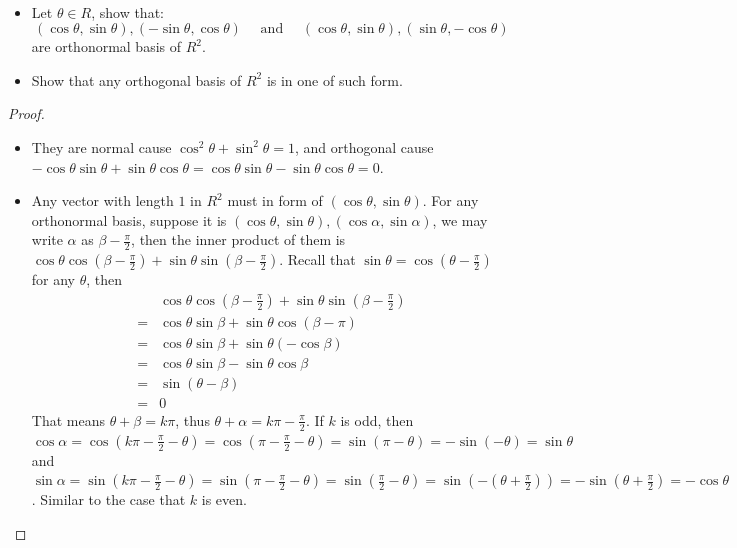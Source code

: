 \documentclass[../main.tex]{subfiles}
\begin{document}
\begin{exercise}
  ~
  \begin{itemize}
    \item Let $\theta \in R$, show that:
          \[
          (\cos \theta, \sin \theta), (- \sin \theta, \cos \theta)
          \quad \text{ and } \quad
          (\cos \theta, \sin \theta), (\sin \theta, - \cos \theta)
          \]
          are orthonormal basis of $R^2$.
    \item Show that any orthogonal basis of $R^2$ is in one of such form.
  \end{itemize}
\end{exercise}
\begin{proof}
  ~
  \begin{itemize}
    \item They are normal cause $\cos^2 \theta + \sin^2 \theta = 1$,
          and orthogonal cause $- \cos \theta \sin \theta + \sin \theta \cos \theta = \cos \theta \sin \theta - \sin \theta \cos \theta = 0$.
    \item Any vector with length $1$ in $R^2$ must in form of $(\cos \theta, \sin \theta)$.
          For any orthonormal basis, suppose it is $(\cos \theta, \sin \theta), (\cos \alpha, \sin \alpha)$,
          we may write $\alpha$ as $\beta - \frac{\pi}{2}$, then the inner product of them
          is $\cos \theta \cos (\beta - \frac{\pi}{2}) + \sin \theta \sin (\beta - \frac{\pi}{2})$.
          Recall that $\sin \theta = \cos (\theta - \frac{\pi}{2})$ for any $\theta$, then
          \begin{align*} 
             & \cos \theta \cos (\beta - \frac{\pi}{2}) + \sin \theta \sin (\beta - \frac{\pi}{2}) \\
            =& \cos \theta \sin \beta + \sin \theta \cos (\beta - \pi) \\
            =& \cos \theta \sin \beta + \sin \theta (- \cos \beta) \\
            =& \cos \theta \sin \beta - \sin \theta \cos \beta \\
            =& \sin (\theta - \beta) \\
            =& 0
          \end{align*}
          That means $\theta + \beta = k \pi$, thus $\theta + \alpha = k \pi - \frac{\pi}{2}$.
          If $k$ is odd, then $\cos \alpha = \cos (k \pi - \frac{\pi}{2} - \theta) = \cos (\pi - \frac{\pi}{2} - \theta) = \sin (\pi - \theta) = - \sin (- \theta) = \sin \theta$
          and $\sin \alpha = \sin (k \pi - \frac{\pi}{2} - \theta) = \sin (\pi - \frac{\pi}{2} - \theta) = \sin (\frac{\pi}{2} - \theta) = \sin (- (\theta + \frac{\pi}{2})) = - \sin (\theta + \frac{\pi}{2}) = - \cos \theta$.
          Similar to the case that $k$ is even.
  \end{itemize}
\end{proof}
\end{document}
